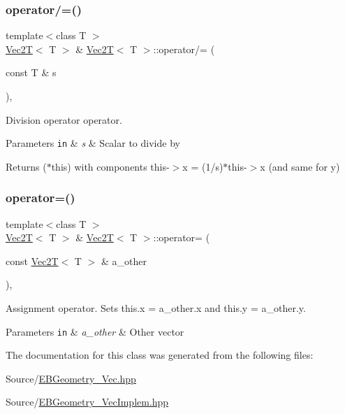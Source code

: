 \subsubsection{\texorpdfstring{operator/=()}{operator/=()}}
{\footnotesize\ttfamily template$<$class T $>$ \\
\hyperlink{classVec2T}{Vec2T}$<$ T $>$ \& \hyperlink{classVec2T}{Vec2T}$<$ T $>$\+::operator/= (\begin{DoxyParamCaption}\item[{const T \&}]{s }\end{DoxyParamCaption})\hspace{0.3cm}{\ttfamily [inline]}, {\ttfamily [noexcept]}}



Division operator operator. 


\begin{DoxyParams}[1]{Parameters}
\mbox{\tt in}  & {\em s} & Scalar to divide by\\
\hline
\end{DoxyParams}
Returns ($\ast$this) with components this-\/$>$x = (1/s)$\ast$this-\/$>$x (and same for y) \mbox{\label{classVec2T_ab44f1c41a9a73757430403ea47e1ff33}} 
\subsubsection{\texorpdfstring{operator=()}{operator=()}}
{\footnotesize\ttfamily template$<$class T $>$ \\
\hyperlink{classVec2T}{Vec2T}$<$ T $>$ \& \hyperlink{classVec2T}{Vec2T}$<$ T $>$\+::operator= (\begin{DoxyParamCaption}\item[{const \hyperlink{classVec2T}{Vec2T}$<$ T $>$ \&}]{a\+\_\+other }\end{DoxyParamCaption})\hspace{0.3cm}{\ttfamily [inline]}, {\ttfamily [noexcept]}}



Assignment operator. Sets this.\+x = a\+\_\+other.\+x and this.\+y = a\+\_\+other.\+y. 


\begin{DoxyParams}[1]{Parameters}
\mbox{\tt in}  & {\em a\+\_\+other} & Other vector \\
\hline
\end{DoxyParams}


The documentation for this class was generated from the following files\+:\begin{DoxyCompactItemize}
\item 
Source/\hyperlink{EBGeometry__Vec_8hpp}{E\+B\+Geometry\+\_\+\+Vec.\+hpp}\item 
Source/\hyperlink{EBGeometry__VecImplem_8hpp}{E\+B\+Geometry\+\_\+\+Vec\+Implem.\+hpp}\end{DoxyCompactItemize}
